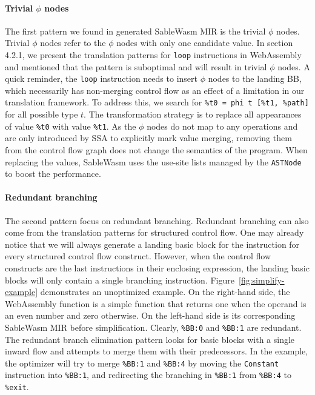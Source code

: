 \paragraph{Trivial $\phi$ nodes}
The first pattern we found in generated SableWasm MIR is the trivial $\phi$
nodes. Trivial $\phi$ nodes refer to the $\phi$ nodes with only one candidate
value. In section 4.2.1, we present the translation patterns for \texttt{loop}
instructions in WebAssembly and mentioned that the pattern is suboptimal and
will result in trivial $\phi$ nodes. A quick reminder, the \texttt{loop}
instruction needs to insert $\phi$ nodes to the landing BB, which necessarily
has non-merging control flow as an effect of a limitation in our translation
framework. To address this, we search for \texttt{\%t0 = phi t [\%t1, \%path]}
for all possible type $t$. The transformation strategy is to replace all
appearances of value \texttt{\%t0} with value \texttt{\%t1}. As the $\phi$ nodes
do not map to any operations and are only introduced by SSA to explicitly mark
value merging, removing them from the control flow graph does not change the
semantics of the program. When replacing the values, SableWasm uses the use-site
lists managed by the \texttt{ASTNode} to boost the performance.

\paragraph{Redundant branching}
The second pattern focus on redundant branching. Redundant branching can also
come from the translation patterns for structured control flow. One may already
notice that we will always generate a landing basic block for the instruction
for every structured control flow construct. However, when the control flow
constructs are the last instructions in their enclosing expression, the landing
basic blocks will only contain a single branching instruction.
Figure~\ref{fig:simplify-example} demonstrates an unoptimized example. On the
right-hand side, the WebAssembly function is a simple function that returns one
when the operand is an even number and zero otherwise. On the left-hand side is
its corresponding SableWasm MIR before simplification. Clearly, \texttt{\%BB:0}
and \texttt{\%BB:1} are redundant. The redundant branch elimination pattern
looks for basic blocks with a single inward flow and attempts to merge them
with their predecessors. In the example, the optimizer will try to merge
\texttt{\%BB:1} and \texttt{\%BB:4} by moving the \texttt{Constant} instruction
into \texttt{\%BB:1}, and redirecting the branching in \texttt{\%BB:1} from
\texttt{\%BB:4} to \texttt{\%exit}.


